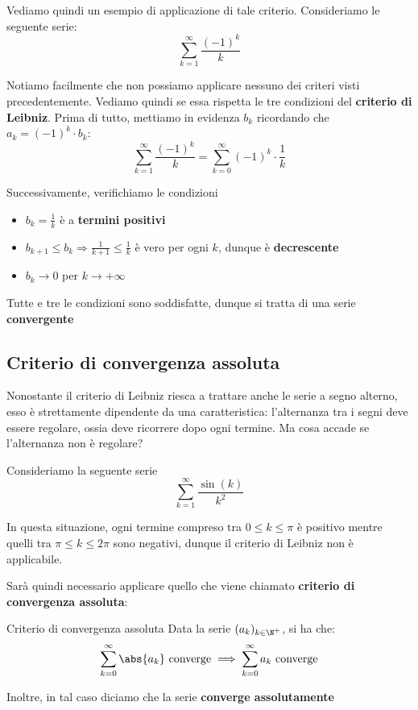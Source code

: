 \documentclass[a4paper, 12pt]{report}
\begin{document}
    Vediamo quindi un esempio di applicazione di tale criterio. Consideriamo le seguente serie:
    \[ \sum_{k=1}^{\infty} \frac{(-1)^k}{k}\]
    
    Notiamo facilmente che non possiamo applicare nessuno dei criteri visti precedentemente. Vediamo quindi se essa rispetta le tre condizioni del \textbf{criterio di Leibniz}.
    Prima di tutto, mettiamo in evidenza $b_k$ ricordando che $a_k = (-1)^k \cdot b_k$:
    \[ \sum_{k=1}^{\infty} \frac{(-1)^k}{k} = \sum_{k=0}^{\infty} (-1)^k \cdot \frac{1}{k}\]
    
    \newpage

    Successivamente, verifichiamo le condizioni
    \begin{itemize}
        \item $b_k = \frac{1}{k}$ è a \textbf{termini positivi}
        \item $b_{k+1} \leq b_k \Longrightarrow \frac{1}{k+1} \leq \frac{1}{k}$ è vero per ogni $k$, dunque è \textbf{decrescente}
        \item $b_k \to 0$ per $k \to +\infty$
    \end{itemize}
    
    Tutte e tre le condizioni sono soddisfatte, dunque si tratta di una serie \textbf{convergente}
    
    
    \quad
    
    \subsection{Criterio di convergenza assoluta}
    
    Nonostante il criterio di Leibniz riesca a trattare anche le serie a segno alterno, esso è strettamente dipendente da una caratteristica: l'alternanza tra i segni deve essere regolare, ossia deve ricorrere dopo ogni termine. Ma cosa accade se l'alternanza non è regolare?
    
    Consideriamo la seguente serie
    \[ \sum_{k = 1}^{\infty} \frac{\sin(k)}{k^2}\]
    
    In questa situazione, ogni termine compreso tra $0 \leq k \leq \pi$ è positivo mentre quelli tra $\pi \leq k \leq 2\pi$ sono negativi, dunque il criterio di Leibniz non è applicabile.
    
    Sarà quindi necessario applicare quello che viene chiamato \textbf{criterio di convergenza assoluta}:
    
    \begin{framedthm}{Criterio di convergenza assoluta}
        Data la serie $(a_k)_{k \in \N^+}$, si ha che:
        \[ \sum_{k=0}^{\infty} \abs{a_k} \text{ converge} \implies \sum_{k=0}^{\infty} a_k \text{ converge}\]
        
        Inoltre, in tal caso diciamo che la serie \textbf{converge assolutamente}
    \end{framedthm}
\end{document}

